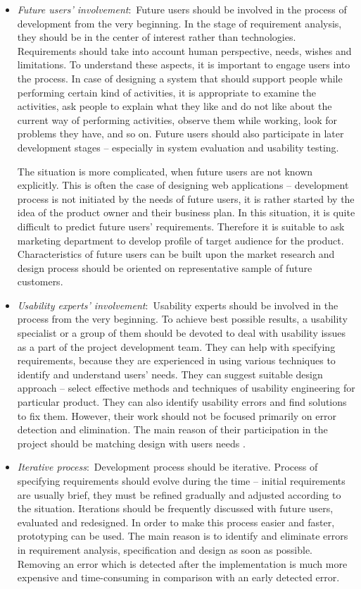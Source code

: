 \documentclass[graybox]{svmult}
\begin{document}
\begin{itemize}
\item \emph{Future users' involvement}: Future users should be involved in the
process of development from the very beginning. In the stage of requirement
analysis, they should be in the center of interest rather than technologies.
Requirements should take into account human perspective, needs, wishes and
limitations. To understand these aspects, it is important to engage users into
the process. In case of designing a system that should support people while
performing certain kind of activities, it is appropriate to examine the
activities, ask people to explain what they like and do not like about the
current way of performing activities, observe them while working, look for
problems they have, and so on. Future users should also participate in later
development stages -- especially in system evaluation and usability testing.

The situation is more complicated, when future users are not known explicitly.
This is often the case of designing web applications -- development process is
not initiated by the needs of future users, it is rather started by the idea
of the product owner and their business plan. In this situation, it is quite
difficult to predict future users' requirements. Therefore it is suitable to
ask marketing department to develop profile of target audience for the
product. Characteristics of future users can be built upon the market research
and design process should be oriented on representative sample of future
customers.

\item \emph{Usability experts' involvement}: Usability experts should be
involved in the process from the very beginning. To achieve best possible
results, a usability specialist or a group of them should be devoted to deal
with usability issues as a part of the project development team. They can help
with specifying requirements, because they are experienced in using various
techniques to identify and understand users' needs. They can suggest suitable
design approach -- select effective methods and techniques of usability
engineering for particular product. They can also identify usability errors
and find solutions to fix them. However, their work should not be focused
primarily on error detection and elimination. The main reason of their
participation in the project should be matching design with users needs
\cite{lund1997another}.

\item \emph{Iterative process}: Development process should be iterative.
Process of specifying requirements should evolve during the time -- initial
requirements are usually brief, they must be refined gradually and adjusted
according to the situation. Iterations should be frequently discussed with
future users, evaluated and redesigned. In order to make this process easier
and faster, prototyping can be used. The main reason is to identify and
eliminate errors in requirement analysis, specification and design as soon as
possible. Removing an error which is detected after the implementation is much
more expensive and time-consuming in comparison with an early detected error.
\end{itemize}
\end{document}
